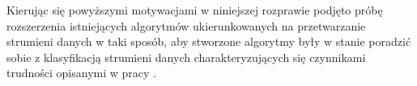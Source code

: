 Kierując się powyższymi motywacjami w niniejszej rozprawie podjęto próbę rozszerzenia istniejących algorytmów ukierunkowanych na przetwarzanie strumieni danych w taki sposób, aby stworzone algorytmy były w stanie poradzić sobie z klasyfikacją strumieni danych charakteryzujących się czynnikami trudności opisanymi w pracy \cite{Article:TypyPrzykladow}.